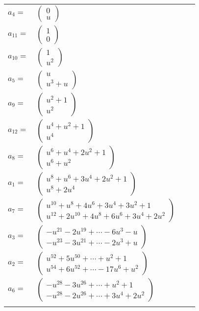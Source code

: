\documentclass[1p]{elsarticle_modified}
\theoremstyle{definition}
\begin{document}
\begin{tabular}{m{7pt} m{180pt} m{7pt} m{180pt} }
\flushright $a_{4}=$&$\begin{pmatrix}0\\u\end{pmatrix}$ \\
\flushright $a_{11}=$&$\begin{pmatrix}1\\0\end{pmatrix}$ \\
\flushright $a_{10}=$&$\begin{pmatrix}1\\u^2\end{pmatrix}$ \\
\flushright $a_{5}=$&$\begin{pmatrix}u\\u^3+u\end{pmatrix}$ \\
\flushright $a_{9}=$&$\begin{pmatrix}u^2+1\\u^2\end{pmatrix}$ \\
\flushright $a_{12}=$&$\begin{pmatrix}u^4+u^2+1\\u^4\end{pmatrix}$ \\
\flushright $a_{8}=$&$\begin{pmatrix}u^6+u^4+2 u^2+1\\u^6+u^2\end{pmatrix}$ \\
\flushright $a_{1}=$&$\begin{pmatrix}u^8+u^6+3 u^4+2 u^2+1\\u^8+2 u^4\end{pmatrix}$ \\
\flushright $a_{7}=$&$\begin{pmatrix}u^{10}+u^8+4 u^6+3 u^4+3 u^2+1\\u^{12}+2 u^{10}+4 u^8+6 u^6+3 u^4+2 u^2\end{pmatrix}$ \\
\flushright $a_{3}=$&$\begin{pmatrix}- u^{21}-2 u^{19}+\cdots-6 u^3- u\\- u^{23}-3 u^{21}+\cdots-2 u^3+u\end{pmatrix}$ \\
\flushright $a_{2}=$&$\begin{pmatrix}u^{52}+5 u^{50}+\cdots+u^2+1\\u^{54}+6 u^{52}+\cdots-17 u^6+u^2\end{pmatrix}$ \\
\flushright $a_{6}=$&$\begin{pmatrix}- u^{28}-3 u^{26}+\cdots+u^2+1\\- u^{28}-2 u^{26}+\cdots+3 u^4+2 u^2\end{pmatrix}$\\&\end{tabular}
\end{document}
